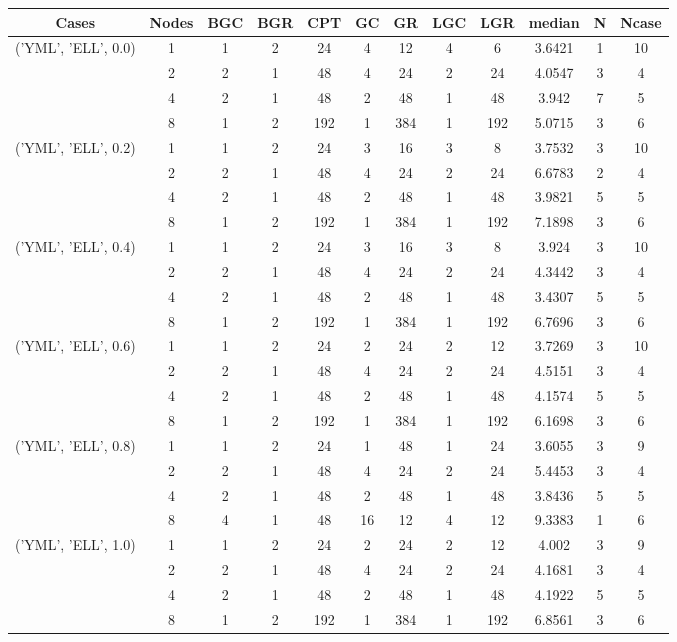 \begin{tabular}{cccccccccccc}
\hline
Cases & Nodes& BGC& BGR& CPT& GC& GR& LGC& LGR& median & N & Ncase \\
\hline
\multirow{4}{*}{('YML', 'ELL', 0.0)}& 1& 1& 2& 24& 4& 12& 4& 6& 3.6421& 1& 10\\
& 2& 2& 1& 48& 4& 24& 2& 24& 4.0547& 3& 4\\
& 4& 2& 1& 48& 2& 48& 1& 48& 3.942& 7& 5\\
& 8& 1& 2& 192& 1& 384& 1& 192& 5.0715& 3& 6\\
\hline
\multirow{4}{*}{('YML', 'ELL', 0.2)}& 1& 1& 2& 24& 3& 16& 3& 8& 3.7532& 3& 10\\
& 2& 2& 1& 48& 4& 24& 2& 24& 6.6783& 2& 4\\
& 4& 2& 1& 48& 2& 48& 1& 48& 3.9821& 5& 5\\
& 8& 1& 2& 192& 1& 384& 1& 192& 7.1898& 3& 6\\
\hline
\multirow{4}{*}{('YML', 'ELL', 0.4)}& 1& 1& 2& 24& 3& 16& 3& 8& 3.924& 3& 10\\
& 2& 2& 1& 48& 4& 24& 2& 24& 4.3442& 3& 4\\
& 4& 2& 1& 48& 2& 48& 1& 48& 3.4307& 5& 5\\
& 8& 1& 2& 192& 1& 384& 1& 192& 6.7696& 3& 6\\
\hline
\multirow{4}{*}{('YML', 'ELL', 0.6)}& 1& 1& 2& 24& 2& 24& 2& 12& 3.7269& 3& 10\\
& 2& 2& 1& 48& 4& 24& 2& 24& 4.5151& 3& 4\\
& 4& 2& 1& 48& 2& 48& 1& 48& 4.1574& 5& 5\\
& 8& 1& 2& 192& 1& 384& 1& 192& 6.1698& 3& 6\\
\hline
\multirow{4}{*}{('YML', 'ELL', 0.8)}& 1& 1& 2& 24& 1& 48& 1& 24& 3.6055& 3& 9\\
& 2& 2& 1& 48& 4& 24& 2& 24& 5.4453& 3& 4\\
& 4& 2& 1& 48& 2& 48& 1& 48& 3.8436& 5& 5\\
& 8& 4& 1& 48& 16& 12& 4& 12& 9.3383& 1& 6\\
\hline
\multirow{4}{*}{('YML', 'ELL', 1.0)}& 1& 1& 2& 24& 2& 24& 2& 12& 4.002& 3& 9\\
& 2& 2& 1& 48& 4& 24& 2& 24& 4.1681& 3& 4\\
& 4& 2& 1& 48& 2& 48& 1& 48& 4.1922& 5& 5\\
& 8& 1& 2& 192& 1& 384& 1& 192& 6.8561& 3& 6\\
\hline
\end{tabular}



